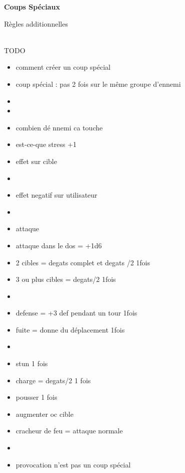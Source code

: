 \documentclass[11pt]{article} %
\newcommand{\myjump}[1][1]{\mbox{}\\[#1cm]}
\begin{document}
\pagestyle{empty}

\begin{center}
    \textbf{Coups Spéciaux}

    Règles additionnelles
\end{center}


\myjump
TODO

\begin{itemize}
    \item comment créer un coup spécial
    \item coup spécial : pas 2 fois sur le même groupe d'ennemi
    \item
    \item
    \item combien dé nnemi ca touche
    \item est-ce-que stress +1
    \item effet sur cible
    \item
    \item effet negatif sur utilisateur
    \item
    \item attaque
    \item attaque dans le dos = +1d6
    \item 2 cibles = degats complet et degats /2 1fois
    \item 3 ou plus cibles = degats/2 1fois
    \item
    \item defense = +3 def pendant un tour 1fois
    \item fuite = donne du déplacement 1fois
    \item
    \item stun 1 fois
    \item charge = degats/2 1 fois
    \item pousser 1 fois
    \item augmenter oc cible
    \item cracheur de feu = attaque normale
    \item
    \item provocation n'est pas un coup spécial

\end{itemize}
\end{document}
